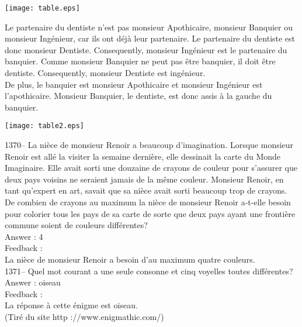 \documentclass[letterpaper, 12pt]{article}
\begin{document}
    \begin{flushleft}
    \texttt{[image: table.eps]}
    \end{flushleft}

Le partenaire du dentiste n'est pas monsieur Apothicaire, monsieur Banquier
ou monsieur Ing\'enieur, car ils ont d\'ej\`a leur partenaire.  Le
partenaire du dentiste est donc monsieur Dentiste.  Consequently,
monsieur Ing\'enieur est le partenaire du banquier.  Comme monsieur Banquier
ne peut pas \^etre banquier, il doit \^etre dentiste.  Consequently,
monsieur Dentiste est ing\'enieur.  \\
De plus, le banquier est monsieur Apothicaire et monsieur Ing\'enieur est
l'apothicaire.  Monsieur Banquier, le dentiste, est donc assis \`a la gauche
du banquier.\\

    \begin{center}
    \texttt{[image: table2.eps]}
    \end{center}

1370-- La ni\`ece de monsieur Renoir a beaucoup d'imagination.
Lorsque monsieur Renoir est all\'e la visiter la semaine derni\`ere,
elle dessinait la carte du \og Monde Imaginaire\fg .  Elle avait
sorti une douzaine de crayons de couleur pour s'assurer que deux
pays voisins ne seraient jamais de la m\^eme couleur.  Monsieur
Renoir, en tant qu'expert en art, savait que sa ni\`ece avait sorti
beaucoup trop de crayons.  De combien de crayons au maximum la
ni\`ece de monsieur Renoir a-t-elle besoin pour colorier tous les
pays de sa carte de sorte que deux pays ayant une fronti\`ere
commune soient de
couleurs diff\'erentes?\\

Answer : 4\\

Feedback : \\
La ni\`ece de monsieur Renoir a besoin d'au maximum quatre couleurs.\\

1371-- Quel mot courant a une seule consonne et cinq voyelles toutes
diff\'erentes?\\

Answer : oiseau\\

Feedback : \\
La r\'eponse \`a cette \'enigme est oiseau.\\
(Tir\'e du site http ://www.enigmathic.com/)\\
\end{document}
